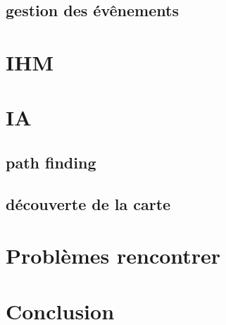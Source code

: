 \documentclass[a4paper 12pts]{article}
\begin{document}
\subsection{gestion des évênements}

\section{IHM}


\newpage
\section{IA}


\subsection{path finding}
\subsection{découverte de la carte}


\newpage
\section{Problèmes rencontrer}


\section{Conclusion}
\end{document}
